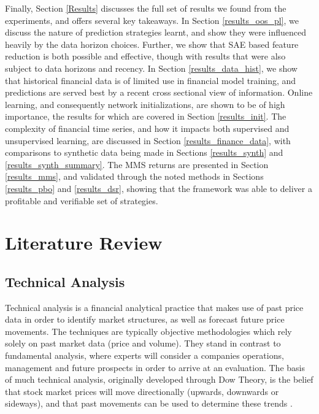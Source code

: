 \documentclass[a4paper,11pt,oneside]{article}
\theoremstyle{plain}
\theoremstyle{definition}
\begin{document}
	Finally, Section \ref{Results} discusses the full set of results we found from the experiments, and offers several key takeaways. In Section \ref{results_oos_pl}, we discuss the nature of prediction strategies learnt, and show they were influenced heavily by the data horizon choices. Further, we show that SAE based feature reduction is both possible and effective, though with results that were also subject to data horizons and recency. In Section \ref{results_data_hist}, we show that historical financial data is of limited use in financial model training, and predictions are served best by a recent cross sectional view of information. Online learning, and consequently network initializations, are shown to be of high importance, the results for which are covered in Section \ref{results_init}. The complexity of financial time series, and how it impacts both supervised and unsupervised learning, are discussed in Section \ref{results_finance_data}, with comparisons to synthetic data being made in Sections \ref{results_synth} and \ref{results_synth_summary}. The MMS returns are presented in Section \ref{results_mms}, and validated through the noted methods in Sections \ref{results_pbo} and \ref{results_dsr}, showing that the framework was able to deliver a profitable and verifiable set of strategies.


	
	
	\newpage
	\section{Literature Review}\label{lr_LiteratureReview}
	\subsection{Technical Analysis}\label{lr_TechnicalAnalysis}
	
	Technical analysis is a financial analytical practice that makes use of past price data in order to identify market 
	structures, as well as forecast future price movements. The techniques are typically objective methodologies 
	which rely solely on past market data (price and volume). They stand in contrast to fundamental analysis, where 
	experts will consider a companies operations, management and future prospects in order to arrive at an evaluation. 
	The basis of much technical analysis, originally developed through Dow Theory, is the belief that stock market 
	prices will move directionally (upwards, downwards or sideways), and that past movements can be used to 
	determine these trends \citep{Murphy}.
	\hfill \break 
	
\end{document}
